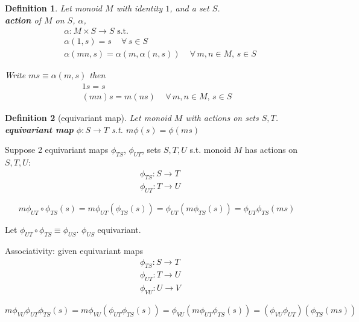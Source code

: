 \documentclass[10pt]{amsart}
\newtheorem{definition}{Definition}
\begin{document}
\begin{multicols*}{2}
\begin{definition}
Let monoid $M$ with identity $1$, and a set $S$. \\
\textbf{action} of $M$ on $S$, $\alpha$, \\
\begin{equation}
\begin{aligned}
& \alpha : M \times S \to S \text{ s.t. } \\  
& \alpha(1,s) = s \quad \, \forall \, s \in S \\
& \alpha(mn, s) = \alpha(m, \alpha(n, s)) \quad \, \forall \, m,n \in M, \, s\in S
\end{aligned}
\end{equation}

Write $ms \equiv \alpha(m, s)$ then 
\[
\begin{gathered} 
1s = s \\
(mn) s = m (ns) \quad \, \forall \, m, n \in M, \, s \in S
\end{gathered}
\]
\end{definition}

\begin{definition}[equivariant map]
	Let monoid $M$ with actions on sets $S,T$. \\
	\textbf{equivariant map} $\phi:S \to T$ s.t. $m\phi(s) = \phi(ms)$
\end{definition}

Suppose 2 equivariant maps $\phi_{TS}$, $\phi_{UT}$, sets $S,T,U$ s.t. monoid $M$ has actions on $S,T,U$: 
\[
\begin{aligned}
& \phi_{TS} : S \to T \\ 
& \phi_{UT} : T \to U
\end{aligned}
\]

\[
m\phi_{UT} \circ \phi_{TS}(s) = m \phi_{UT}(\phi_{TS}(s)) = \phi_{UT}(m\phi_{TS}(s)) = \phi_{UT} \phi_{TS} (ms) 
\]

Let $\phi_{UT} \circ \phi_{TS} \equiv \phi_{US}$. $\phi_{US}$ equivariant.

Associativity: given equivariant maps 
\[
\begin{aligned}
& \phi_{TS} : S \to T \\ 
& \phi_{UT} : T \to U \\ 
& \phi_{VU} : U \to V 
\end{aligned}
\]

\[
m \phi_{VU} \phi_{UT} \phi_{TS}(s) = m \phi_{VU} (\phi_{UT} \phi_{TS}(s)) = \phi_{VU} (m \phi_{UT} \phi_{TS}(s)) = (\phi_{VU} \phi_{UT}) (\phi_{TS}(ms))
\]


\end{multicols*}
\end{document}
